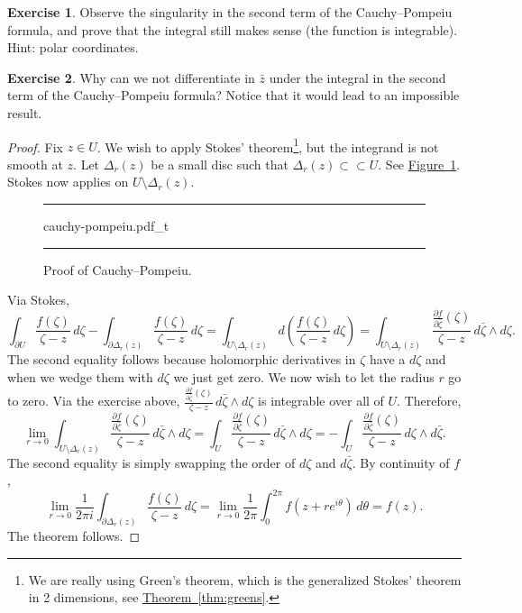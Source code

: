 \documentclass[12pt,openany]{book}
\theoremstyle{plain}
\theoremstyle{remark}
\theoremstyle{definition}
\newenvironment{exbox}{%
    \def\FrameCommand{\vrule width 1pt \relax\hspace{10pt}}%
    \MakeFramed{\advance\hsize-\width\FrameRestore}%
}{%
    \endMakeFramed
}
\newenvironment{myfig}{%
\begin{figure}[h!t]
\noindent\rule{\textwidth}{0.5pt}\vspace{12pt}\par\centering}%
{\par\noindent\rule{\textwidth}{0.5pt}
\end{figure}}
\theoremstyle{exercise}
\newtheorem{exercise}{Exercise}[section]
\theoremstyle{example}
\newcommand{\figureref}[1]{\hyperref[#1]{Figure~\ref*{#1}}}
\newcommand{\thmref}[1]{\hyperref[#1]{Theorem~\ref*{#1}}}
\begin{document}
\begin{exbox}
\begin{exercise}
Observe the singularity in the second term of the Cauchy--Pompeiu formula,
and prove that the integral still makes
sense (the function is integrable).  Hint: polar coordinates.
\end{exercise}

\begin{exercise}
Why can we not differentiate in $\bar{z}$ under the integral in the second
term of the Cauchy--Pompeiu formula?
Notice that it would lead to an impossible result.
\end{exercise}
\end{exbox}

\begin{proof}
Fix $z \in U$.  We wish to apply Stokes' theorem\footnote{%
We are really using Green's theorem, which is the generalized
Stokes' theorem in 2 dimensions, see \thmref{thm:greens}.},
but the integrand is not smooth at $z$.
Let $\Delta_r(z)$ be a small disc such that
$\Delta_r(z) \subset
\subset U$.  See \figureref{fig:cauchy-pompeiu}.
Stokes now applies on $U \setminus \Delta_r(z)$.

\begin{myfig}
{cauchy-pompeiu.pdf_t}
\caption{Proof of Cauchy--Pompeiu.\label{fig:cauchy-pompeiu}}
\end{myfig}

Via Stokes,
\begin{equation*}
\int_{\partial U} \frac{f(\zeta)}{\zeta-z}\,  d\zeta -
\int_{\partial \Delta_r(z)} \frac{f(\zeta)}{\zeta-z}\,  d\zeta
=
\int_{U \setminus \Delta_r(z)} d\left( \frac{f(\zeta)}{\zeta-z} \, d\zeta \right)
=
\int_{U \setminus \Delta_r(z)} \frac{\frac{\partial f}{\partial
\bar{\zeta}}(\zeta)}{\zeta-z} \, d\bar{\zeta} \wedge d\zeta .
\end{equation*}
The second equality follows because holomorphic derivatives in $\zeta$
have a $d\zeta$ and when we wedge them with $d\zeta$ we just get zero.
We now wish to let the radius $r$ go to zero.
Via the exercise above,
$\frac{\frac{\partial f}{\partial \bar{\zeta}}(\zeta)}{\zeta-z} \, d\bar{\zeta} \wedge d\zeta$
is integrable over all of $U$.  Therefore,
\begin{equation*}
\lim_{r \to 0}
\int_{U \setminus \Delta_r(z)} \frac{\frac{\partial f}{\partial
\bar{\zeta}}(\zeta)}{\zeta-z} \, d\bar{\zeta} \wedge d\zeta
=
\int_{U} \frac{\frac{\partial f}{\partial
\bar{\zeta}}(\zeta)}{\zeta-z} \, d\bar{\zeta} \wedge d\zeta
=
-
\int_{U} \frac{\frac{\partial f}{\partial
\bar{\zeta}}(\zeta)}{\zeta-z} \, d\zeta \wedge d\bar{\zeta} .
\end{equation*}
The second equality is simply swapping the order of $d\zeta$ and
$d\bar{\zeta}$.
By continuity of $f$,
\begin{equation*}
\lim_{r \to 0}
\frac{1}{2\pi i}
\int_{\partial \Delta_r(z)} \frac{f(\zeta)}{\zeta-z}\,  d\zeta
=
\lim_{r \to 0}
\frac{1}{2\pi}
\int_0^{2\pi} f(z + r e^{i\theta})\, d\theta
=
f(z) .
\end{equation*}
The theorem follows.
\end{proof}
\end{document}
